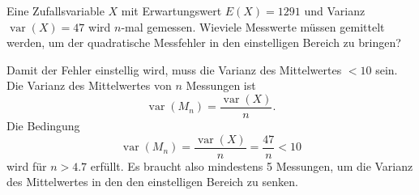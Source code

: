 Eine Zufallsvariable $X$ mit Erwartungswert $E(X)=1291$ und
Varianz $\operatorname{var}(X)=47$ wird $n$-mal gemessen.
Wieviele Messwerte müssen gemittelt werden, um der quadratische
Messfehler in den einstelligen Bereich zu bringen?

\begin{loesung}
Damit der Fehler einstellig wird, muss die Varianz des Mittelwertes
$<10$ sein.
Die Varianz des Mittelwertes von $n$ Messungen ist
\[
\operatorname{var}(M_n)
=
\frac{\operatorname{var}(X)}{n}.
\]
Die Bedingung
\[
\operatorname{var}(M_n)
=
\frac{\operatorname{var}(X)}{n}
=
\frac{47}{n}
<
10
\]
wird für $n>4.7$ erfüllt.
Es braucht also mindestens 5 Messungen, um die Varianz des Mittelwertes
in den den einstelligen Bereich zu senken.
\end{loesung}
